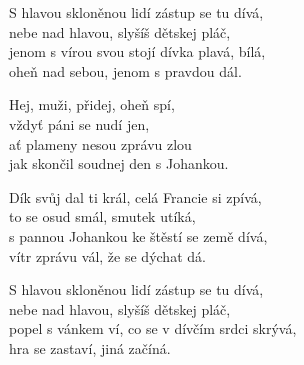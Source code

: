 
\ve{}
S hlavou skloněnou lidí zástup se tu dívá,\\
nebe nad hlavou, slyšíš dětskej pláč,\\
jenom s vírou svou stojí dívka plavá, bílá,\\
oheň nad sebou, jenom s pravdou dál.

\cho{}
Hej, muži, přidej, oheň spí,\\
vždyť páni se nudí jen,\\
ať plameny nesou zprávu zlou\\
jak skončil soudnej den s Johankou.

\ve{}
Dík svůj dal ti král, celá Francie si zpívá,\\
to se osud smál, smutek utíká,\\
s pannou Johankou ke štěstí se země dívá,\\
vítr zprávu vál, že se dýchat dá.

\cho{}

\ve{}
S hlavou skloněnou lidí zástup se tu dívá,\\
nebe nad hlavou, slyšíš dětskej pláč,\\
popel s vánkem ví, co se v dívčím srdci skrývá,\\
hra se zastaví, jiná začíná.

\cho{}

\esong{}